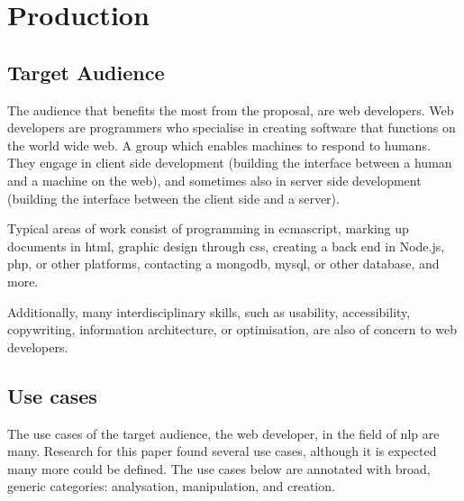 \chapter{Production}\label{production}

\section{Target Audience}\label{target-audience}

The audience that benefits the most from the proposal, are web developers.
Web developers are programmers who specialise in creating software that
  functions on the world wide web.
A group which enables machines to respond to humans.
They engage in client side development (building the interface between
  a human and a machine on the web), and sometimes also in server side
  development (building the interface between the client side and a
  server).

Typical areas of work consist of programming in \gls{ecmascript},
  marking up documents in \gls{html}, graphic design through \gls{css},
  creating a back end in Node.js, \gls{php}, or other platforms, contacting a
  \gls{mongodb}, \gls{mysql}, or other database, and more.

Additionally, many interdisciplinary skills, such as usability,
  accessibility, copywriting, information architecture, or optimisation,
  are also of concern to web developers.

\section{Use cases}\label{use-cases}

The use cases of the target audience, the web developer, in the field of
  \gls{nlp} are many.
Research for this paper found several use cases, although it is
  expected many more could be defined.
The use cases below are annotated with broad, generic categories:
  analysation, manipulation, and creation.

